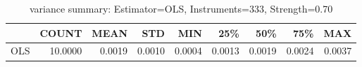 \begin{table}[ht]
\centering
\caption{variance summary: Estimator=OLS, Instruments=333, Strength=0.70}
\begin{tabular}{lrrrrrrrr}
\toprule
 & COUNT & MEAN & STD & MIN & 25\% & 50\% & 75\% & MAX \\
\midrule
OLS & 10.0000 & 0.0019 & 0.0010 & 0.0004 & 0.0013 & 0.0019 & 0.0024 & 0.0037 \\
\bottomrule
\end{tabular}
\end{table}
